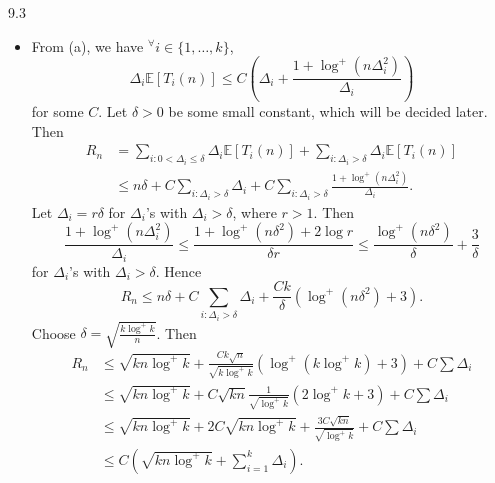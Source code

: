 \documentclass[10pt]{article}
\theoremstyle{definition}
\newenvironment{solution*}[1]{%
  \IfBlankTF{#1}
    {\renewcommand{\themanualsolutioninner}{\unskip}}
    {\renewcommand\themanualsolutioninner{#1}}%
  \manualsolutioninner
}{\endmanualsolutioninner}
\begin{document}
\begin{solution*}{9.3}
\begin{itemize}
        \item[(b)] From (a), we have $^\forall i \in \{1, \ldots, k \}$,
        \begin{equation*}
            \Delta_i \mathbb{E} \left[ T_i (n) \right] \leq C \left(\Delta_i + \frac{1 + \log^+ (n \Delta_i^2)}{\Delta_i}\right)
        \end{equation*}
        for some $C$.
        Let $\delta > 0$ be some small constant, which will be decided later.
        Then
        \begin{align*}
            R_n &= \sum_{i:0<\Delta_i \leq \delta} \Delta_i \mathbb{E}\left[T_i(n) \right] + \sum_{i:\Delta_i > \delta} \Delta_i \mathbb{E} \left[ T_i (n) \right] \\
            &\leq n\delta + C \sum_{i: \Delta_i > \delta} \Delta_i + C \sum_{i : \Delta_i > \delta} \frac{1 + \log^+ (n\Delta_i^2)}{\Delta_i}.
        \end{align*}
        Let $\Delta_i = r\delta$ for $\Delta_i$'s with $\Delta_i > \delta$, where $r>1$.
        Then
        \begin{equation*}
            \frac{1 + \log^+ (n\Delta_i^2)}{\Delta_i} \leq \frac{1 + \log^+ (n\delta^2) + 2\log r}{\delta r} \leq \frac{\log^+ (n\delta^2)}{\delta} + \frac{3}{\delta}
        \end{equation*}
        for $\Delta_i$'s with $\Delta_i > \delta$. Hence
        \begin{equation*}
            R_n \leq n\delta + C \sum_{i:\Delta_i > \delta} \Delta_i + \frac{C k}{\delta} \left(\log^+(n\delta^2) + 3 \right).
        \end{equation*}
        Choose $\delta = \sqrt{\frac{k\log^+ k}{n}}$.
        Then
        \begin{align*}
            R_n &\leq \sqrt{kn\log^+ k} + \frac{C k \sqrt{n}}{\sqrt{k\log^+ k}}\left(\log^+ (k\log^+ k ) + 3 \right) + C \sum \Delta_i \\
            &\leq \sqrt{kn \log^+ k} + C \sqrt{kn}\frac{1}{\sqrt{\log^+ k}}\left( 2\log^+ k + 3 \right) + C \sum \Delta_i \\
            &\leq \sqrt{kn \log^+ k} + 2C \sqrt{kn\log^+ k} + \frac{3C \sqrt{kn}}{\sqrt{\log^+ k}} + C \sum \Delta_i \\
            &\leq C \left( \sqrt{kn \log^+ k} + \sum_{i=1}^k \Delta_i \right).
        \end{align*}


\end{itemize}
\end{solution*}
\end{document}
